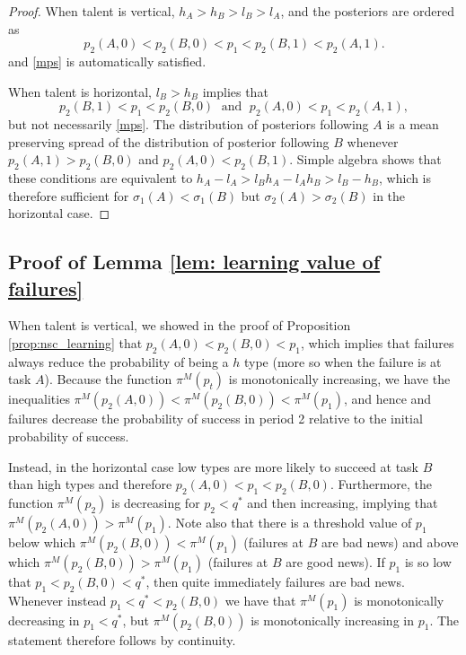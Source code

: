 \documentclass[12pt,american]{paper}
\theoremstyle{remark}
\begin{document}
\begin{proof}
%
When talent is vertical, $h_A>h_B>l_B>l_A$, and
the posteriors are ordered as
\begin{equation*}
p_2(A,0)<p_2(B,0)<p_1<p_2(B,1)<p_2(A,1).
\end{equation*} 
and \eqref{mps} is automatically satisfied.

%
When talent is horizontal,  $l_B>h_B$ implies that 
\[  p_2(B,1)<p_1<p_2(B,0) \;\text{ and }\; p_2(A,0)<p_1<p_2(A,1), \]
but not necessarily \eqref{mps}. The distribution of posteriors following $A$ is a mean preserving spread of the distribution of posterior following $B$ whenever $p_2(A,1)>p_2(B,0)$ and $p_2(A,0)<p_2(B,1)$. Simple algebra shows that these conditions are equivalent to $h_A-l_A>l_Bh_A-l_Ah_B >l_B-h_B$, which is therefore sufficient for $\sigma_1(A)<\sigma_1(B)$ but $\sigma_2(A)>\sigma_2(B)$ in the horizontal case.
%

\end{proof}










\subsection*{Proof of Lemma \ref{lem: learning value of failures}}



When talent is vertical, we showed in the proof of Proposition \ref{prop:nsc_learning}  that $p_2(A,0)<p_2(B,0)<p_1$, which implies that failures always reduce the probability of being a $h$ type (more so when the failure is at task $A$). Because the function $\pi^M(p_t)$ is monotonically increasing, we have the inequalities $\pi^M(p_2(A,0))<\pi^M(p_2(B,0))<\pi^M(p_1)$, and hence and failures decrease the probability of success in period 2 relative to the initial probability of success.

 
Instead, in the horizontal case low types are more likely to succeed at task $B$ than high types and therefore $ p_2(A,0)<p_1<p_2(B,0)$. Furthermore, the function $\pi^M(p_2)$ is decreasing for $p_2<q^*$ and then increasing, implying that  $\pi^M(p_2(A,0))>\pi^M(p_1)$. Note also that there is a threshold value of $p_1$ below which $\pi^M(p_2(B,0))<\pi^M(p_1)$ (failures at $B$ are bad news) and above which  $\pi^M(p_2(B,0))>\pi^M(p_1)$ (failures at $B$ are good news). If $p_1$ is so low that  $p_1<p_2(B,0)<q^*$, then quite immediately failures are bad news. Whenever instead  $p_1<q^*<p_2(B,0)$ we have that $\pi^M(p_1)$ is monotonically decreasing in $p_1<q^*$, but $\pi^M(p_2(B,0))$ is monotonically increasing in $p_1$. The statement therefore follows by continuity.
\end{document}
